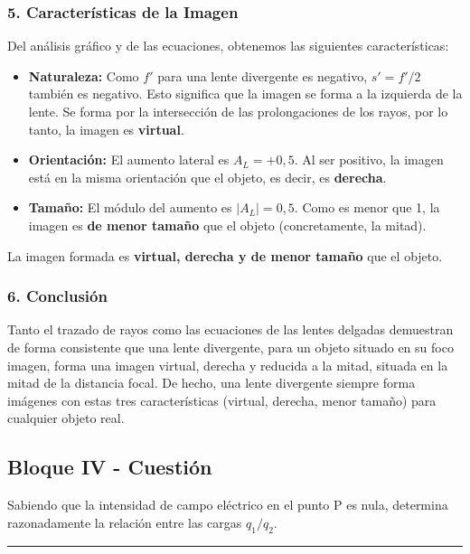 \subsubsection*{5. Características de la Imagen}
Del análisis gráfico y de las ecuaciones, obtenemos las siguientes características:
\begin{itemize}
    \item \textbf{Naturaleza:} Como $f'$ para una lente divergente es negativo, $s' = f'/2$ también es negativo. Esto significa que la imagen se forma a la izquierda de la lente. Se forma por la intersección de las prolongaciones de los rayos, por lo tanto, la imagen es \textbf{virtual}.
    \item \textbf{Orientación:} El aumento lateral es $A_L = +0,5$. Al ser positivo, la imagen está en la misma orientación que el objeto, es decir, es \textbf{derecha}.
    \item \textbf{Tamaño:} El módulo del aumento es $|A_L| = 0,5$. Como es menor que 1, la imagen es \textbf{de menor tamaño} que el objeto (concretamente, la mitad).
\end{itemize}
\begin{cajaresultado}
La imagen formada es \textbf{virtual, derecha y de menor tamaño} que el objeto.
\end{cajaresultado}

\subsubsection*{6. Conclusión}
\begin{cajaconclusion}
Tanto el trazado de rayos como las ecuaciones de las lentes delgadas demuestran de forma consistente que una lente divergente, para un objeto situado en su foco imagen, forma una imagen virtual, derecha y reducida a la mitad, situada en la mitad de la distancia focal. De hecho, una lente divergente siempre forma imágenes con estas tres características (virtual, derecha, menor tamaño) para cualquier objeto real.
\end{cajaconclusion}

\newpage
\subsection{Bloque IV - Cuestión}
\label{subsec:B4_2014_jun_ord}

\begin{cajaenunciado}
Sabiendo que la intensidad de campo eléctrico en el punto P es nula, determina razonadamente la relación entre las cargas $q_1/q_2$.
\end{cajaenunciado}
\hrule

